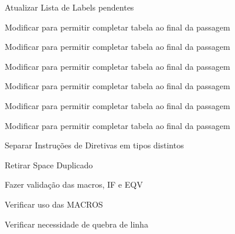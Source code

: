 
\begin{DoxyRefList}
\item[\label{todo__todo000001}%
\hypertarget{todo__todo000001}{}%
Membro \hyperlink{assembler_8cpp_a54fad2c006413b60d87eea48e412471b}{add\-New\-Label} (string str\-Label, int addr\-Label, int line\-Count, string line)]Atualizar Lista de Labels pendentes  
\item[\label{todo__todo000002}%
\hypertarget{todo__todo000002}{}%
Membro \hyperlink{assembler_8cpp_a45dcd38a718d16b9fdcda1e45c4ad5de}{add\-New\-Symbol\-I\-N\-S\-T1} (string str\-Inst1, string str\-Arg1, int line\-Count, string line)]Modificar para permitir completar tabela ao final da passagem  
\item[\label{todo__todo000003}%
\hypertarget{todo__todo000003}{}%
Membro \hyperlink{assembler_8cpp_ad85cc701dcbc6e69b1c273a99c2262d8}{add\-New\-Symbol\-I\-N\-S\-T1\-P\-L\-U\-S} (string str\-Inst1, string str\-Arg1, int num\-Arg1\-Plus, int line\-Count, string line)]Modificar para permitir completar tabela ao final da passagem  
\item[\label{todo__todo000004}%
\hypertarget{todo__todo000004}{}%
Membro \hyperlink{assembler_8cpp_a4b08bb4206172aa8ae36e47f8298e274}{add\-New\-Symbol\-I\-N\-S\-T2} (string str\-Inst2, string str\-Arg1, string str\-Arg2, int line\-Count, string line)]Modificar para permitir completar tabela ao final da passagem 

Modificar para permitir completar tabela ao final da passagem  
\item[\label{todo__todo000006}%
\hypertarget{todo__todo000006}{}%
Membro \hyperlink{assembler_8cpp_a23fbad662368f294c55a33dfa57a904c}{add\-New\-Symbol\-I\-N\-S\-T2\-P\-L\-U\-S\-P\-L\-U\-S} (string str\-Inst2, string str\-Arg1, int num\-Arg1\-Plus, string str\-Arg2, int num\-Arg2\-Plus, int line\-Count, string line)]Modificar para permitir completar tabela ao final da passagem 

Modificar para permitir completar tabela ao final da passagem  
\item[\label{todo__todo000008}%
\hypertarget{todo__todo000008}{}%
Membro \hyperlink{languagedefinition_8h_a1830ff5737e4f1610e975ee2aa489206}{Instruction\-Code} ]Separar Instruções de Diretivas em tipos distintos 

Retirar Space Duplicado  
\item[\label{todo__todo000009}%
\hypertarget{todo__todo000009}{}%
Membro \hyperlink{macroeval_8h_ab726e2a9f26698bddb5ddd13683e6630}{macroeval} (int argc, char $\ast$$\ast$argv)]Fazer validação das macros, I\-F e E\-Q\-V 

Verificar uso das M\-A\-C\-R\-O\-S 

Verificar necessidade de quebra de linha 
\end{DoxyRefList}